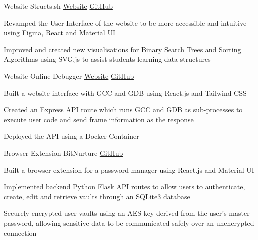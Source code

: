 

\begin{cventries}

  \cventry
    {Website} %
    {Structs.sh} %
    {\href{https://structs.sh}{\faGlobe Website}} %
    {\href{https://github.com/csesoc/structs.sh}{\faGithub GitHub}} %
    {
      \begin{cvitems} %
        \item {Revamped the User Interface of the website to be more accessible and intuitive using Figma, React and Material UI}
        \item {Improved and created new visualisations for Binary Search Trees and Sorting Algorithms using SVG.js to assist students learning data structures}
      \end{cvitems}
    }

  \cventry
    {Website} %
    {Online Debugger} %
    {\href{https://online-debugger.onrender.com}{\faGlobe Website}} %
    {\href{https://github.com/jedwed/online-debugger}{\faGithub GitHub}} %
    {
      \begin{cvitems} %
        \item {Built a website interface with GCC and GDB using React.js and Tailwind CSS}
        \item {Created an Express API route which runs GCC and GDB as sub-processes to execute user code and send frame information as the response}
        \item {Deployed the API using a Docker Container}
      \end{cvitems}
    }

    \cventry
    {Browser Extension} %
    {BitNurture} %
    {} %
    {\href{https://github.com/jedwed/bitnurture}{\faGithub GitHub}} %
    {
      \begin{cvitems} %
        \item {Built a browser extension for a password manager using React.js and Material UI}
        \item {Implemented backend Python Flask API routes to allow users to authenticate, create, edit and retrieve vaults through an SQLite3 database}
        \item {Securely encrypted user vaults using an AES key derived from the user's master password, allowing sensitive data to be communicated safely over an unencrypted connection}
      \end{cvitems}
    }

\end{cventries}
